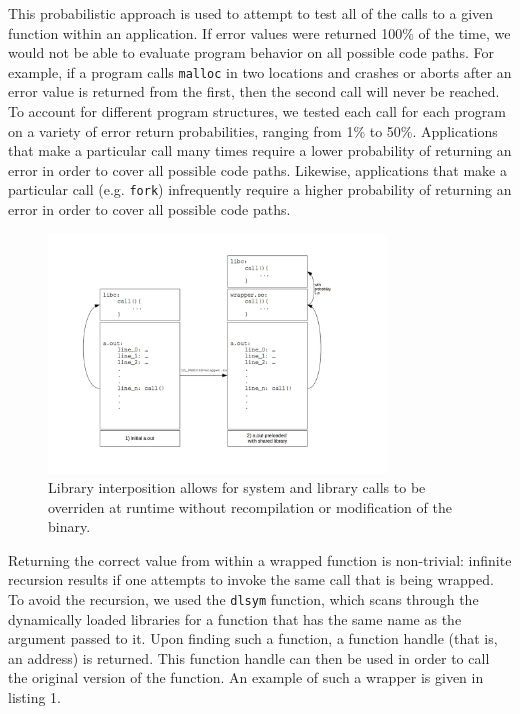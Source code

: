 This probabilistic approach is used to attempt to test all of the calls to a given function within an application. If error values were returned 100\% of the time, we would not be able to evaluate program behavior on all possible code paths. For example, if a program calls \texttt{malloc} in two locations and crashes or aborts after an error value is returned from the first, then the second call will never be reached. To account for different program structures, we tested each call for each program on a variety of error return probabilities, ranging from 1\% to 50\%. Applications that make a particular call many times require a lower probability of returning an error in order to cover all possible code paths. Likewise, applications that make a particular call (e.g. \texttt{fork}) infrequently require a higher probability of returning an error in order to cover all possible code paths.
\begin{figure}
  \centering
	\includegraphics[width=0.8\textwidth]{ldpreload_fig}
	\caption{Library interposition allows for system and library calls to be overriden at runtime without recompilation or modification of the binary.}
  \label{fig:ld_preload}
\end{figure}

Returning the correct value from within a wrapped function is non-trivial: infinite recursion results if one attempts to invoke the same call that is being wrapped. To avoid the recursion, we used the \texttt{dlsym} function, which scans through the dynamically loaded libraries for a function that has the same name as the argument passed to it. Upon finding such a function, a function handle (that is, an address) is returned. This function handle can then be used in order to call the original version of the function. An example of such a wrapper is given in listing 1.

\begin{minipage}{\linewidth} %
	
\end{minipage}


